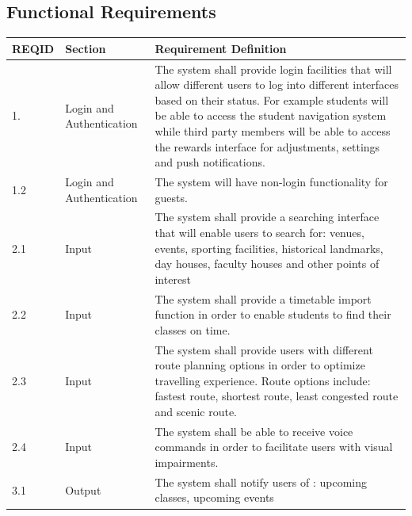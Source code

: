 \documentclass[12pt]{article}
\begin{document}
\subsection{Functional Requirements}
\begin{longtable}{|p{}| p{} | p{} |}

\hline

REQID& Section & Requirement Definition \\

\hline

1.& Login and Authentication & The system shall provide login facilities that will allow different users to log into different interfaces based on their status. For example students will be able to access the student navigation system while third party members will be able to access the rewards interface for adjustments, settings and push notifications.  \\

\hline

1.2& Login and Authentication   & The system will have non-login functionality for guests. \\

\hline

2.1& Input & The system shall provide a searching interface that will enable users to search for: venues, events, sporting facilities, historical landmarks, day houses, faculty houses and other points of interest  \\

\hline

2.2& Input  & The system shall provide a timetable import function in order to enable students to find their classes on time.  \\

\hline

2.3& Input  & The system shall provide users with different route planning options in order to optimize travelling experience. Route options include: fastest route, shortest route, least congested route and scenic route. \\

\hline

2.4& Input  & The system shall be able to receive voice commands in order to facilitate users with visual impairments.\\

\hline

3.1& Output & The system shall notify users of : upcoming classes, upcoming events\\


\end{longtable}
\end{document}
